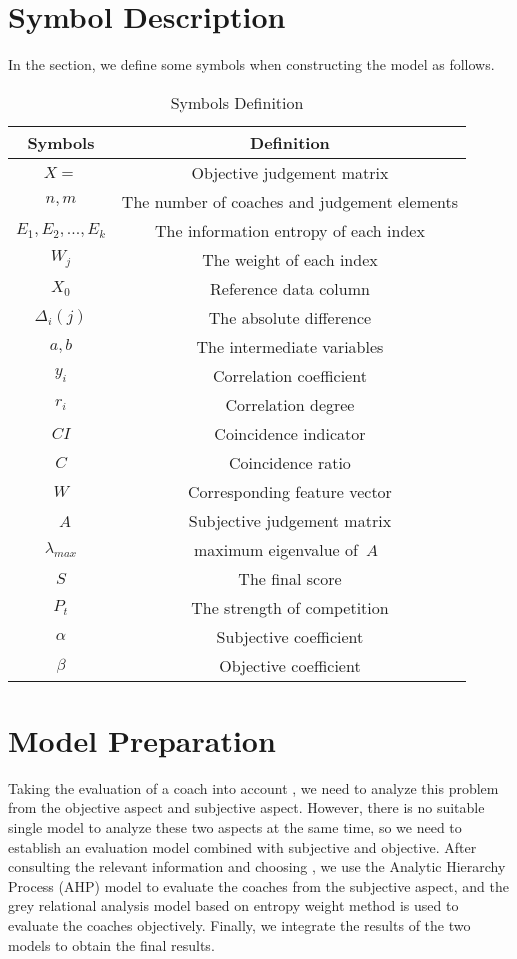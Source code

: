 \documentclass{mcmthesis}
\begin{document}
\section{Symbol Description} 
\par In the section, we define some symbols when constructing the model as follows.
\begin{table}[h]
\centering
 \caption{\label{tab:test}Symbols Definition}
 \begin{tabular}{cc}
  \toprule
 Symbols & Definition  \\
  \midrule
$X=$&Objective judgement matrix  \\
$n,m$ &The number of coaches and judgement elements  \\
${E}_{1},{E}_{2},...,{E}_{k}$ &The information entropy of each index \\
${W}_{j}$&The weight of each index\\
${X}_{0}$&     Reference data column\\
${\Delta }_{i}(j)$& The absolute difference\\
$a,b $& The intermediate variables\\
${y}_{i}$& Correlation coefficient\\
${r}_{i} $&Correlation degree\\
$CI$&  Coincidence indicator\\
$C$ &Coincidence ratio\\
$W$&  Corresponding feature vector\\\
$A$&Subjective judgement matrix  \\
${\lambda }_{max}$ & maximum eigenvalue of~$A$~\\
$S$&The final score\\
${P}_{t}$&The strength of competition \\
$\alpha $ &Subjective coefficient\\
$\beta $ & Objective coefficient\\
  \bottomrule
 \end{tabular}
\end{table}

\section{Model Preparation} 
\par Taking the evaluation of a coach into account , we need to analyze this problem from the objective aspect and subjective aspect. However, there is no suitable single model to analyze these two aspects at the same time, so we need to establish an evaluation model combined with subjective and objective. After consulting the relevant information and choosing , we use the Analytic Hierarchy Process (AHP) model to evaluate the coaches from the subjective aspect, and the grey relational analysis model based on entropy weight method is used to evaluate the coaches objectively. Finally, we integrate the results of the two models to obtain the final results.
\end{document}
